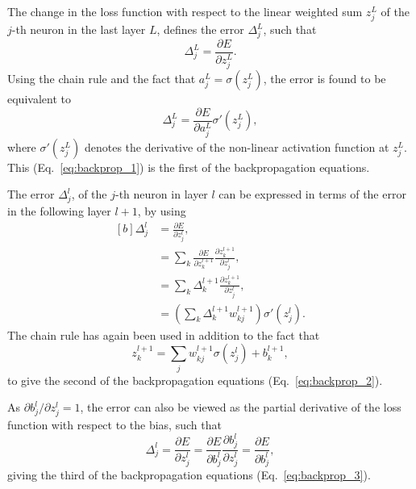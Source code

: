 The change in the loss function with respect to the linear weighted sum $z^{L}_{j}$ of the $j$-th
neuron in the last layer $L$, defines the error $\Delta^{L}_{j}$, such that
\begin{equation} %
    \Delta^{L}_{j}=\frac{\partial E}{\partial z^{L}_{j}}.
\end{equation}
Using the chain rule and the fact that $a^{L}_{j}=\sigma(z^{L}_{j})$, the error is found to be
equivalent to
\begin{equation} %
    \Delta^{L}_{j}=\frac{\partial E}{\partial a^{L}_{j}}
    \sigma '(z^{L}_{j}),
    \label{eq:backprop_1}
\end{equation}
where $\sigma '(z^{L}_{j})$ denotes the derivative of the non-linear activation function at
$z^{L}_{j}$. This (Eq.~\ref{eq:backprop_1}) is the first of the backpropagation equations.

The error $\Delta^{l}_{j}$, of the $j$-th neuron in layer $l$ can be expressed in terms of the
error in the following layer $l+1$, by using
\begin{equation} %
    \begin{aligned}[b]
        \Delta^{l}_{j} &=\frac{\partial E}{\partial z^{l}_{j}}, \\
        &=\sum_{k}\frac{\partial E}{\partial z^{l+1}_{k}}
        \frac{\partial z^{l+1}_{k}}{\partial z^{l}_{j}}, \\
        &=\sum_{k}\Delta^{l+1}_{k}\frac{\partial z^{l+1}_{k}}{\partial z^{l}_{j}}, \\
        &=\left(\sum_{k}\Delta^{l+1}_{k}w^{l+1}_{kj}\right)\sigma '(z^{l}_{j}).
        \label{eq:backprop_2}
    \end{aligned}
\end{equation}
The chain rule has again been used in addition to the fact that
\begin{equation}
    z^{l+1}_{k}=\sum_{j}w^{l+1}_{kj}\sigma(z^{l}_{j})+b^{l+1}_k,
\end{equation}
to give the second of the backpropagation equations (Eq.~\ref{eq:backprop_2}).

As $\partial b^{l}_{j}/\partial z^{l}_{j}=1$, the error can also be viewed as the partial
derivative of the loss function with respect to the bias, such that
\begin{equation} %
    \Delta^{l}_{j}=\frac{\partial E}{\partial z^{l}_{j}}
    =\frac{\partial E}{\partial b^{l}_{j}}\frac{\partial b^{l}_{j}}{\partial z^{l}_{j}}
    =\frac{\partial E}{\partial b^{l}_{j}},
    \label{eq:backprop_3}
\end{equation}
giving the third of the backpropagation equations (Eq.~\ref{eq:backprop_3}).

